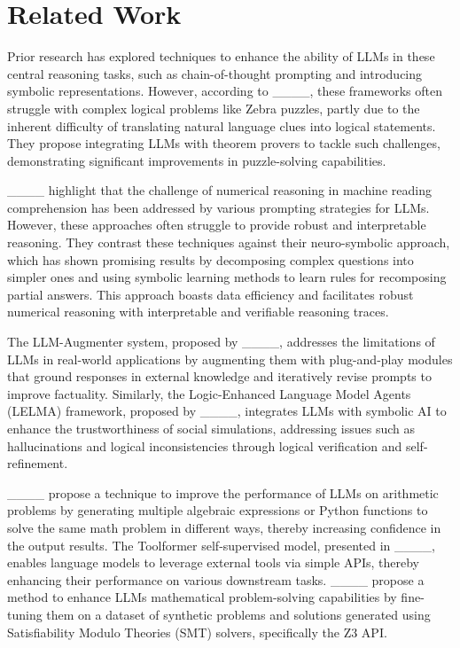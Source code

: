 \section{Related Work}
Prior research has explored techniques to enhance the ability of LLMs in these
central reasoning tasks, such as chain-of-thought prompting and introducing
symbolic representations. However, according to
____, these frameworks often struggle with
complex logical problems like Zebra puzzles, partly due to the inherent
difficulty of translating natural language clues into logical statements. They
propose integrating LLMs with theorem provers to tackle such challenges,
demonstrating significant improvements in puzzle-solving capabilities.

____ highlight that the challenge of numerical
reasoning in machine reading comprehension has been addressed by various
prompting strategies for LLMs. However, these approaches often struggle to
provide robust and interpretable reasoning. They contrast these techniques
against their neuro-symbolic approach, which has shown promising results by
decomposing complex questions into simpler ones and using symbolic learning
methods to learn rules for recomposing partial answers. This approach boasts
data efficiency and facilitates robust numerical reasoning with interpretable
and verifiable reasoning traces.

The LLM-Augmenter system, proposed by ____,
addresses the limitations of LLMs in real-world applications by augmenting them
with plug-and-play modules that ground responses in external knowledge and
iteratively revise prompts to improve factuality. Similarly, the Logic-Enhanced
Language Model Agents (LELMA) framework, proposed by
____, integrates LLMs with
symbolic AI to enhance the trustworthiness of social simulations, addressing
issues such as hallucinations and logical inconsistencies through logical
verification and self-refinement.

____ propose a technique to
improve the performance of LLMs on arithmetic problems by generating multiple
algebraic expressions or Python functions to solve the same math problem in
different ways, thereby increasing confidence in the output results. The
Toolformer self-supervised model, presented in
____, enables language models to
leverage external tools via simple APIs, thereby enhancing their performance on
various downstream tasks. ____ propose a method to enhance
LLMs mathematical problem-solving capabilities by fine-tuning them on a dataset
of synthetic problems and solutions generated using Satisfiability Modulo
Theories (SMT) solvers, specifically the Z3 API.

